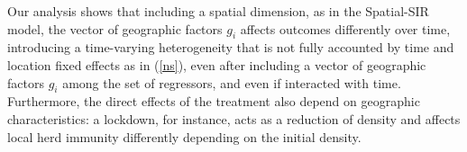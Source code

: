 \documentclass[english,11pt]{article}
\begin{document}
Our analysis shows that including a spatial dimension, as in the Spatial-SIR model, the vector of geographic factors  $g_i$  affects outcomes differently over time, introducing a time-varying heterogeneity that is not fully accounted by time and location fixed effects as in (\ref{ns}), even after including a vector of geographic factors  $g_i$  among the set of regressors, and even if interacted with time. Furthermore, the direct effects of the treatment also depend on geographic characteristics: a lockdown, for instance, acts as a reduction of density and affects local herd immunity differently depending on the initial density.  


\end{document}
